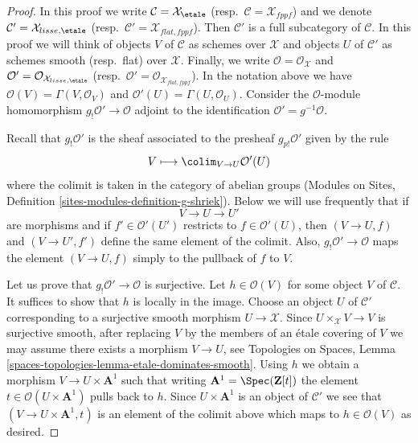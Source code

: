 \begin{proof}
In this proof we write
$\mathcal{C} = \mathcal{X}_\etale$
(resp.\ $\mathcal{C} = \mathcal{X}_{fppf}$)
and we denote
$\mathcal{C}' = \mathcal{X}_{lisse,\etale}$
(resp.\ $\mathcal{C}' = \mathcal{X}_{flat, fppf}$).
Then $\mathcal{C}'$ is a full subcategory of $\mathcal{C}$.
In this proof we will think of objects $V$ of $\mathcal{C}$
as schemes over $\mathcal{X}$ and objects $U$ of $\mathcal{C}'$
as schemes smooth (resp.\ flat) over $\mathcal{X}$.
Finally, we write $\mathcal{O} = \mathcal{O}_\mathcal{X}$
and $\mathcal{O}' = \mathcal{O}_{\mathcal{X}_{lisse,\etale}}$
(resp.\ $\mathcal{O}' = \mathcal{O}_{\mathcal{X}_{flat,fppf}}$).
In the notation above we have $\mathcal{O}(V) = \Gamma(V, \mathcal{O}_V)$
and $\mathcal{O}'(U) = \Gamma(U, \mathcal{O}_U)$.
Consider the $\mathcal{O}$-module homomorphism
$g_!\mathcal{O}' \to \mathcal{O}$
adjoint to the identification $\mathcal{O}' = g^{-1}\mathcal{O}$.

\medskip\noindent
Recall that $g_!\mathcal{O}'$ is the sheaf associated to the presheaf
$g_{p!}\mathcal{O}'$ given by the rule
$$
V \longmapsto \colim_{V \to U} \mathcal{O}'(U)
$$
where the colimit is taken in the category of abelian groups
(Modules on Sites, Definition \ref{sites-modules-definition-g-shriek}).
Below we will use frequently that if
$$
V \to U \to U'
$$
are morphisms and if $f' \in \mathcal{O}'(U')$ restricts to
$f \in \mathcal{O}'(U)$, then $(V \to U, f)$ and $(V \to U', f')$
define the same element of the colimit. Also,
$g_!\mathcal{O}' \to \mathcal{O}$ maps the element
$(V \to U, f)$ simply to the pullback of $f$ to $V$.

\medskip\noindent
Let us prove that $g_!\mathcal{O}' \to \mathcal{O}$ is surjective.
Let $h \in \mathcal{O}(V)$ for some object $V$ of $\mathcal{C}$.
It suffices to show that $h$ is locally in the image. Choose an object
$U$ of $\mathcal{C}'$ corresponding to a surjective smooth morphism
$U \to \mathcal{X}$. Since $U \times_\mathcal{X} V \to V$ is surjective
smooth, after replacing $V$ by the members of an \'etale covering of $V$
we may assume there exists a morphism $V \to U$, see
Topologies on Spaces, Lemma
\ref{spaces-topologies-lemma-etale-dominates-smooth}. Using $h$ we obtain
a morphism $V \to U \times \mathbf{A}^1$ such that writing
$\mathbf{A}^1 = \Spec(\mathbf{Z}[t])$ the element
$t \in \mathcal{O}(U \times \mathbf{A}^1)$ pulls back to $h$.
Since $U \times \mathbf{A}^1$ is an object of $\mathcal{C}'$
we see that $(V \to U \times \mathbf{A}^1, t)$
is an element of the colimit above which maps to $h \in \mathcal{O}(V)$
as desired.


\end{proof}

